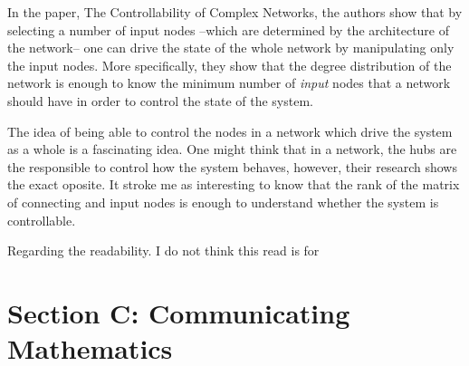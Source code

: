 \documentclass[11pt]{article}
\begin{document}
In the paper, The Controllability of Complex Networks, the authors show that by selecting a number of input nodes --which are determined by the architecture of the network-- one can drive the state of the whole network by manipulating only the input nodes. More specifically, they show that the degree distribution of the network is enough to know the minimum number of \textit{input} nodes that a network should have in order to control the state of the system.

The idea of being able to control the nodes in a network which drive the system as a whole is a fascinating idea. One might think that in a network, the hubs are the responsible to control how the system behaves, however, their research shows the exact oposite. It stroke me as interesting to know that the rank of the matrix of connecting and input nodes is enough to understand whether the system is controllable.

Regarding the readability. I do not think this read is for 

\section*{Section C: Communicating Mathematics}
\end{document}
